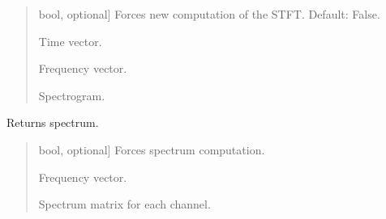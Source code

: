 \documentclass[letterpaper,10pt,english]{sphinxmanual}
\begin{document}
\begin{fulllineitems}
\begin{fulllineitems}
\begin{quote}
\begin{description}
\begin{description}
\sphinxlineitem{\sphinxstylestrong{force\_computation}}{[}bool, optional{]}
\sphinxAtStartPar
Forces new computation of the STFT. Default: False.

\end{description}

\begin{description}
\sphinxlineitem{\sphinxstylestrong{t\_s}}{[}\sphinxtitleref{np.ndarray}{]}
\sphinxAtStartPar
Time vector.

\sphinxlineitem{\sphinxstylestrong{f\_hz}}{[}\sphinxtitleref{np.ndarray}{]}
\sphinxAtStartPar
Frequency vector.

\sphinxlineitem{\sphinxstylestrong{spectrogram}}{[}\sphinxtitleref{np.ndarray}{]}
\sphinxAtStartPar
Spectrogram.

\end{description}

\end{description}\end{quote}

\end{fulllineitems}


\begin{fulllineitems}
\label{\detokenize{classes:dsptoolbox.classes.signal_class.Signal.get_spectrum}}
\pysigstartsignatures
{}
\pysigstopsignatures
\sphinxAtStartPar
Returns spectrum.
\begin{quote}\begin{description}
\begin{description}
\sphinxlineitem{\sphinxstylestrong{force\_computation}}{[}bool, optional{]}
\sphinxAtStartPar
Forces spectrum computation.

\end{description}

\begin{description}
\sphinxlineitem{\sphinxstylestrong{spectrum\_freqs}}{[}\sphinxtitleref{np.ndarray}{]}
\sphinxAtStartPar
Frequency vector.

\sphinxlineitem{\sphinxstylestrong{spectrum}}{[}\sphinxtitleref{np.ndarray}{]}
\sphinxAtStartPar
Spectrum matrix for each channel.


\end{description}
\end{description}
\end{quote}
\end{fulllineitems}
\end{fulllineitems}
\end{document}
